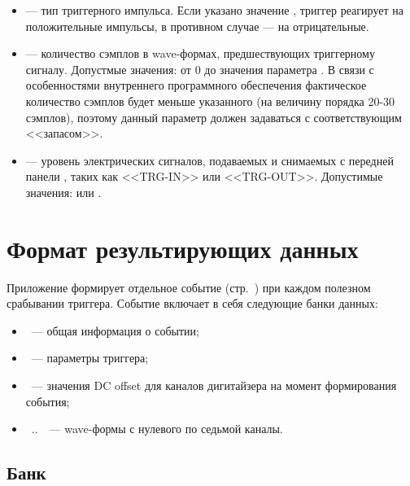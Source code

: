 \begin{itemize}
\item {} --- тип триггерного импульса. Если указано значение , триггер реагирует на положительные импульсы, в противном случае --- на отрицательные.

\item 
\label{item-pre-trigger-length}

 --- количество сэмплов в wave-формах, предшествующих триггерному сигналу. Допустмые значения: от 0 до значения параметра . В связи с особенностями внутреннего программного обеспечения \DEVICE{} \cite{CaenUM5961PostTrigger} фактическое количество сэмплов будет меньше указанного (на величину порядка 20-30 сэмплов), поэтому данный параметр должен задаваться с соответствующим <<запасом>>.

\item {} --- уровень электрических сигналов, подаваемых и снимаемых с передней панели \DEVICE{}, таких как <<TRG-IN>> или <<TRG-OUT>>. Допустимые значения:  или .

\end{itemize}

\section{Формат результирующих данных}

Приложение  формирует отдельное событие (стр.~\pageref{sec-midas-event}) при каждом полезном срабывании триггера. Событие включает в себя следующие банки данных:

\begin{itemize}

\item {}~--- общая информация о событии;
\item {}~--- параметры триггера;
\item {}~--- значения DC offset для каналов дигитайзера на момент формирования события;
\item {}~..~~--- wave-формы с нулевого по седьмой каналы.

\end{itemize}

\subsection{Банк }
\label{sec_bank_info}

